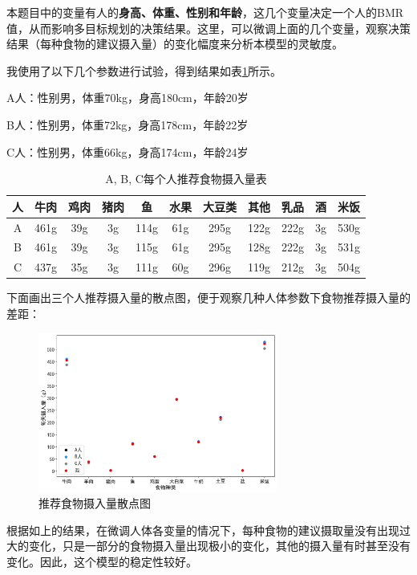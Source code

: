 \documentclass{SYSUReport}
\begin{document}
本题目中的变量有人的\textbf{身高、体重、性别和年龄}，这几个变量决定一个人的BMR值，从而影响多目标规划的决策结果。这里，可以微调上面的几个变量，观察决策结果（每种食物的建议摄入量）的变化幅度来分析本模型的灵敏度。

我使用了以下几个参数进行试验，得到结果如表\ref{every-person-intake-table}所示。

A人：性别男，体重70kg，身高180cm，年龄20岁

B人：性别男，体重72kg，身高178cm，年龄22岁

C人：性别男，体重66kg，身高174cm，年龄24岁
\begin{table}[h!]
\centering
\renewcommand\arraystretch{0.65}
\begin{tabular}{ccccccccccc}
\toprule
人 & 牛肉 & 鸡肉 & 猪肉 & 鱼 & 水果 & 大豆类 & 其他 & 乳品 & 酒 & 米饭 \\
\midrule
A & 461g & 39g & 3g & 114g & 61g & 295g & 122g & 222g & 3g & 530g \\
B & 461g & 39g & 3g & 115g & 61g & 295g & 128g & 222g & 3g & 531g \\
C & 437g & 35g & 3g & 111g & 60g & 296g & 119g & 212g & 3g & 504g \\
\bottomrule
\end{tabular}
\caption{A, B, C每个人推荐食物摄入量表}
\label{every-person-intake-table}
\end{table}

下面画出三个人推荐摄入量的散点图，便于观察几种人体参数下食物推荐摄入量的差距：
\begin{figure}[h]
	\centering
	\includegraphics[width=0.7\textwidth]{figures/fig4.png}
	\caption{推荐食物摄入量散点图}
	\label{scatter-fig}
\end{figure}

根据如上的结果，在微调人体各变量的情况下，每种食物的建议摄取量没有出现过大的变化，只是一部分的食物摄入量出现极小的变化，其他的摄入量有时甚至没有变化。因此，这个模型的稳定性较好。
\end{document}
